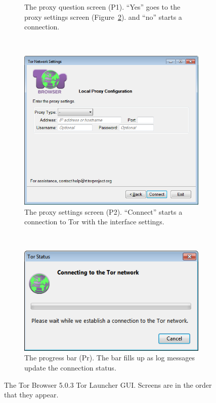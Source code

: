 \documentclass[USenglish,oneside,twocolumn]{article}
\begin{document}
\begin{figure}
\begin{subfigure}[b]{0.30\textwidth}
	\centering\captionsetup{width=1.5\linewidth}%
	\caption{The proxy question screen (P1). ``Yes'' goes to the proxy settings screen (Figure~\ref{fig:old-proxy-yes}). and ``no'' starts a connection.}
	\label{fig:old-proxy}
\end{subfigure}
~~~~~~~~~~
\begin{subfigure}[b]{0.30\textwidth}
	\includegraphics[width=\textwidth]{screenshots/OLD-proxyYES.png}
	\centering\captionsetup{width=1.5\linewidth}%
	\caption{The proxy settings screen (P2). ``Connect'' starts a connection to Tor with the interface settings.}
	\label{fig:old-proxy-yes}
\end{subfigure}
~~~~~~~~~~~~~~~~~~~~~~~~~
\begin{subfigure}[b]{0.30\textwidth}
	\includegraphics[width=\textwidth]{screenshots/OLD-progress.png}
	\centering\captionsetup{width=1.5\linewidth}%
	\caption{The progress bar (Pr). The bar fills up as log messages update the connection status. }
	\label{fig:old-progress}
\end{subfigure}
\caption{
The Tor Browser 5.0.3 Tor Launcher GUI. Screens are in the order that they appear. 
}
\label{fig:old-interface}
\end{figure} 
\end{document}
